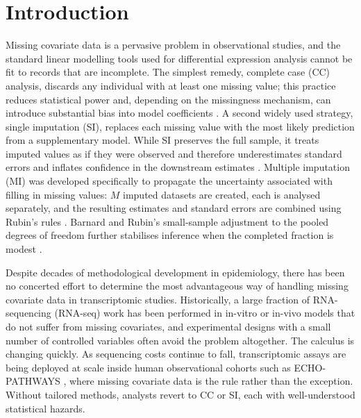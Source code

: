 \section{Introduction}

Missing covariate data is a pervasive problem in observational studies, and the standard linear modelling tools used for differential expression analysis cannot be fit to records that are incomplete. The simplest remedy, complete case (CC) analysis, discards any individual with at least one missing value; this practice reduces statistical power and, depending on the missingness mechanism, can introduce substantial bias into model coefficients \cite{sterne2009multiple,little2019statistical}. A second widely used strategy, single imputation (SI), replaces each missing value with the most likely prediction from a supplementary model. While SI preserves the full sample, it treats imputed values as if they were observed and therefore underestimates standard errors and inflates confidence in the downstream estimates \cite{rubin1987multiple,sterne2009multiple}. Multiple imputation (MI) was developed specifically to propagate the uncertainty associated with filling in missing values: $M$ imputed datasets are created, each is analysed separately, and the resulting estimates and standard errors are combined using Rubin's rules \cite{rubin1987multiple,marshall2009combining}. Barnard and Rubin's small-sample adjustment to the pooled degrees of freedom further stabilises inference when the completed fraction is modest \cite{barnard1999smalls}.

Despite decades of methodological development in epidemiology, there has been no concerted effort to determine the most advantageous way of handling missing covariate data in transcriptomic studies. Historically, a large fraction of RNA-sequencing (RNA-seq) work has been performed in in-vitro or in-vivo models that do not suffer from missing covariates, and experimental designs with a small number of controlled variables often avoid the problem altogether. The calculus is changing quickly. As sequencing costs continue to fall, transcriptomic assays are being deployed at scale inside human observational cohorts such as ECHO-PATHWAYS \cite{paulson2022lewinn,paquette2023placental}, where missing covariate data is the rule rather than the exception. Without tailored methods, analysts revert to CC or SI, each with well-understood statistical hazards.

